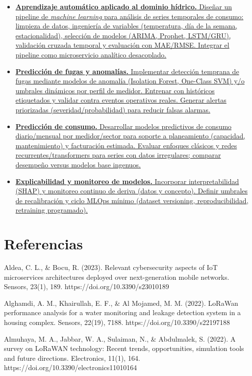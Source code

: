 \documentclass[12pt,a4paper,oneside]{report}
\providecommand{\ul}[1]{\uline{#1}}
\begin{document}
\begin{itemize}
  \item \ul{\textbf{Aprendizaje automático aplicado al dominio hídrico.} Diseñar un pipeline de \emph{machine learning} para análisis de series temporales de consumo: limpieza de datos, ingeniería de variables (temperatura, día de la semana, estacionalidad), selección de modelos (ARIMA, Prophet, LSTM/GRU), validación cruzada temporal y evaluación con MAE/RMSE. Integrar el pipeline como microservicio analítico desacoplado.}
  \item \ul{\textbf{Predicción de fugas y anomalías.} Implementar detección temprana de fugas mediante modelos de anomalía (Isolation Forest, One-Class SVM) y/o umbrales dinámicos por perfil de medidor. Entrenar con históricos etiquetados y validar contra eventos operativos reales. Generar alertas priorizadas (severidad/probabilidad) para reducir falsas alarmas.}
  \item \ul{\textbf{Predicción de consumo.} Desarrollar modelos predictivos de consumo diario/mensual por medidor/sector para soporte a planeamiento (capacidad, mantenimiento) y facturación estimada. Evaluar enfoques clásicos y redes recurrentes/transformers para series con datos irregulares; comparar desempeño versus modelos base ingenuos.}
  \item \ul{\textbf{Explicabilidad y monitoreo de modelos.} Incorporar interpretabilidad (SHAP) y monitoreo continuo de deriva (datos y concepto). Definir umbrales de recalibración y ciclo MLOps mínimo (dataset versioning, reproducibilidad, retraining programado).}
\end{itemize}

\chapter*{Referencias}

Aldea, C. L., \& Bocu, R. (2023). Relevant cybersecurity aspects of IoT microservices architectures deployed over next-generation mobile networks. Sensors, 23(1), 189. https://doi.org/10.3390/s23010189

Alghamdi, A. M., Khairullah, E. F., \& Al Mojamed, M. M. (2022). LoRaWan performance analysis for a water monitoring and leakage detection system in a housing complex. Sensors, 22(19), 7188. https://doi.org/10.3390/s22197188

Almuhaya, M. A., Jabbar, W. A., Sulaiman, N., \& Abdulmalek, S. (2022). A survey on LoRaWAN technology: Recent trends, opportunities, simulation tools and future directions. Electronics, 11(1), 164. https://doi.org/10.3390/electronics11010164
\end{document}
